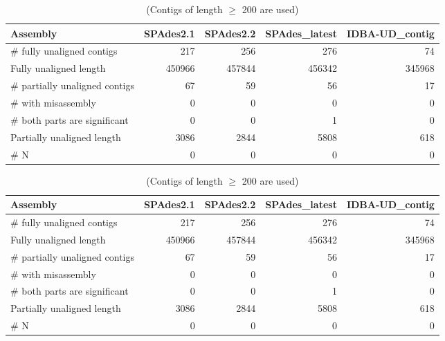 \begin{table}[ht]
\begin{center}
\caption{(Contigs of length $\geq$ 200 are used)}
\begin{tabular}{|l*{4}{|r}|}
\hline
Assembly & SPAdes2.1 & SPAdes2.2 & SPAdes\_latest & IDBA-UD\_contig \\ \hline
\# fully unaligned contigs & 217 & 256 & 276 & 74 \\ \hline
Fully unaligned length & 450966 & 457844 & 456342 & 345968 \\ \hline
\# partially unaligned contigs & 67 & 59 & 56 & 17 \\ \hline
    \# with misassembly & 0 & 0 & 0 & 0 \\ \hline
    \# both parts are significant & 0 & 0 & 1 & 0 \\ \hline
Partially unaligned length & 3086 & 2844 & 5808 & 618 \\ \hline
\# N & 0 & 0 & 0 & 0 \\ \hline
\end{tabular}
\end{center}
\end{table}
\begin{table}[ht]
\begin{center}
\caption{(Contigs of length $\geq$ 200 are used)}
\begin{tabular}{|l*{4}{|r}|}
\hline
Assembly & SPAdes2.1 & SPAdes2.2 & SPAdes\_latest & IDBA-UD\_contig \\ \hline
\# fully unaligned contigs & 217 & 256 & 276 & 74 \\ \hline
Fully unaligned length & 450966 & 457844 & 456342 & 345968 \\ \hline
\# partially unaligned contigs & 67 & 59 & 56 & 17 \\ \hline
    \# with misassembly & 0 & 0 & 0 & 0 \\ \hline
    \# both parts are significant & 0 & 0 & 1 & 0 \\ \hline
Partially unaligned length & 3086 & 2844 & 5808 & 618 \\ \hline
\# N & 0 & 0 & 0 & 0 \\ \hline
\end{tabular}
\end{center}
\end{table}
